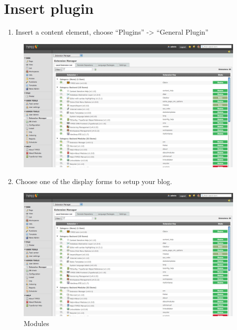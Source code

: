 \documentclass[a4paper,10pt,english]{sphinxmanual}
\begin{document}
\section{Insert plugin}
\label{AdministratorManual/Index:insert-plugin}\begin{enumerate}
\item {} 
Insert a content element, choose ``Plugins'' -\textgreater{} ``General Plugin''

\end{enumerate}
\begin{figure}[htbp]
\centering

\includegraphics{ExtensionManager.png}
\end{figure}
\begin{enumerate}
\setcounter{enumi}{1}
\item {} 
Choose one of the display forms to setup your blog.

\end{enumerate}
\begin{figure}[htbp]
\centering
\capstart

\includegraphics{ExtensionManager.png}
\caption{Modules}\end{figure}
\end{document}
